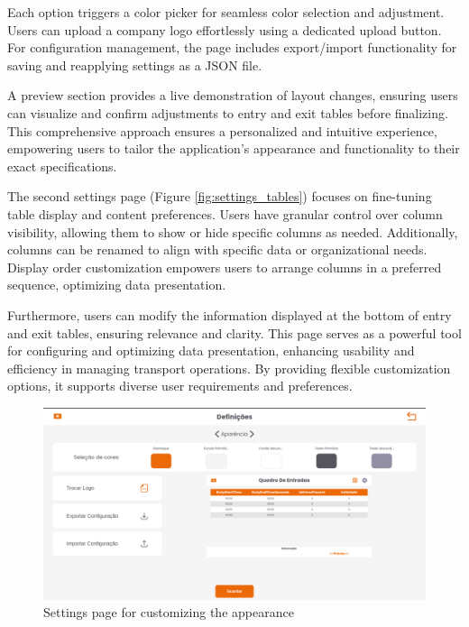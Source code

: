 \documentclass[10pt]{article}
\begin{document}
        Each option triggers a color picker for seamless color selection and adjustment.
        Users can upload a company logo effortlessly using a dedicated upload button. For configuration management, the page includes export/import functionality for saving and reapplying settings as a JSON file. 
        
        A preview section provides a live demonstration of layout changes, ensuring users can visualize and confirm adjustments to entry and exit tables before finalizing.
        This comprehensive approach ensures a personalized and intuitive experience, empowering users to tailor the application's appearance and functionality to their exact specifications.
        
        The second settings page (Figure \ref{fig:settings_tables}) focuses on fine-tuning table display and content preferences. Users have granular control over column visibility, allowing them to show or hide specific columns as needed. Additionally, columns can be renamed to align with specific data or organizational needs.
        Display order customization empowers users to arrange columns in a preferred sequence, optimizing data presentation. 
        
        Furthermore, users can modify the information displayed at the bottom of entry and exit tables, ensuring relevance and clarity.
        This page serves as a powerful tool for configuring and optimizing data presentation, enhancing usability and efficiency in managing transport operations. By providing flexible customization options, it supports diverse user requirements and preferences.

        \vfill
        \begin{figure}[htbp!]
            \centering
            \includegraphics[width=1\textwidth]{aparencia}
            \caption{Settings page for customizing the appearance}
            \label{fig:settings_appearance}
        \end{figure}
        \vfill
\end{document}
